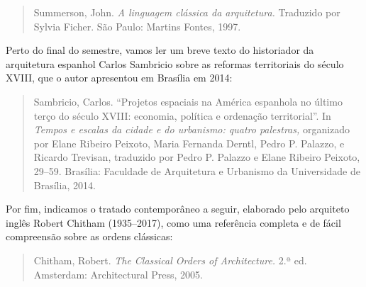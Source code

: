 \documentclass[
  11pt,
  brazil,
  a4paper,
]{article}
\begin{document}
\begin{quote}
Summerson, John. \emph{A linguagem clássica da arquitetura.} Traduzido
por Sylvia Ficher. São Paulo: Martins Fontes, 1997.
\end{quote}

Perto do final do semestre, vamos ler um breve texto do historiador da
arquitetura espanhol Carlos Sambricio sobre as reformas territoriais do
século XVIII, que o autor apresentou em Brasília em 2014:

\begin{quote}
Sambricio, Carlos. ``Projetos espaciais na América espanhola no último
terço do século XVIII: economia, política e ordenação territorial''. In
\emph{Tempos e escalas da cidade e do urbanismo: quatro palestras,}
organizado por Elane Ribeiro Peixoto, Maria Fernanda Derntl, Pedro P.
Palazzo, e Ricardo Trevisan, traduzido por Pedro P. Palazzo e Elane
Ribeiro Peixoto, 29--59. Brasília: Faculdade de Arquitetura e Urbanismo
da Universidade de Brasília, 2014.
\end{quote}

Por fim, indicamos o tratado contemporâneo a seguir, elaborado pelo
arquiteto inglês Robert Chitham (1935--2017), como uma referência
completa e de fácil compreensão sobre as ordens clássicas:

\begin{quote}
Chitham, Robert. \emph{The Classical Orders of Architecture.} 2.ª ed.
Amsterdam: Architectural Press, 2005.
\end{quote}

\nocite{*}

\printbibliography[title={Tratados e fontes primárias},heading=subbibintoc,keyword={Fontes}]

\printbibliography[title={Bibliografia Básica},heading=subbibintoc,keyword={Básica}]

\printbibliography[title={Bibliografia Complementar},heading=subbibintoc,keyword={Complementar}]

\printbibliography
\end{document}
